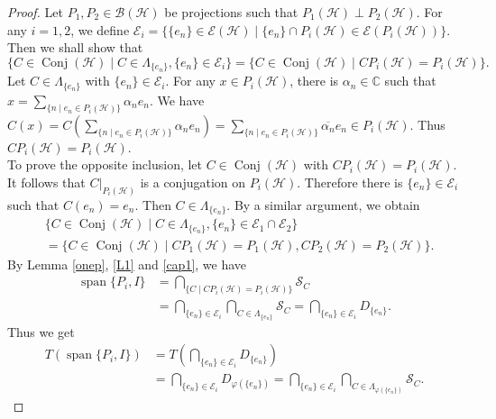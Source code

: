 \documentclass[11pt]{amsart}
\theoremstyle{remark}
\newcommand{\BH}{\mathcal{B(H)}}
\newcommand{\cH}{{\mathcal{H}}}
\newcommand{\SC}{\mathcal{S}_C}
\newcommand{\Conj}{\operatorname{Conj}(\cH)}
\newcommand{\Span}{\operatorname{span}}
\begin{document}
\begin{proof}
Let $P_1, P_2 \in \BH$ be projections such that $P_1(\cH) \perp P_2(\cH)$. 
For any $i=1,2$, we define $\mathcal{E}_i=\{ \{e_n\} \in \mathcal{E}(\cH) \mid \{e_n\} \cap P_i(\cH) \in \mathcal{E}(P_i(\cH))\}$. Then we shall show that 
\begin{equation}\label{cap1}
    \{ C \in \Conj \mid C \in \Lambda_{\{e_n\}}, \{e_n\} \in \mathcal{E}_i\}=\{ C \in \Conj \mid CP_i(\cH)=P_i(\cH)\}.
\end{equation}
Let $C \in \Lambda_{\{e_n\}}$ with $\{e_n\} \in \mathcal{E}_i$. For any $x \in P_i(\cH)$, there is $\alpha_n \in \mathbb{C}$ such that $x=\sum_{\{n \mid e_n \in P_i(\cH)\}} \alpha_ne_n$. We have $C(x)=C(\sum_{\{n \mid e_n \in P_i(\cH)\}} \alpha_ne_n)=\sum_{\{n \mid e_n \in P_i(\cH)\}}\overline{\alpha_n}e_n \in P_i(\cH)$. Thus $CP_i(\cH)=P_i(\cH)$. \\
To prove the opposite inclusion, let $C \in \Conj$ with $CP_i(\cH)=P_i(\cH)$. It follows that $C|_{P_i(\cH)}$ is a conjugation on $P_i(\cH)$. Therefore there is $\{e_n\} \in \mathcal{E}_i$ such that $C(e_n)=e_n$. Then $C \in \Lambda_{\{e_n\}}$. 
By a similar argument, we obtain
\begin{equation}\label{cap12}
    \begin{split}
        &\{ C \in \Conj \mid C \in \Lambda_{\{e_n\}}, \{e_n\} \in \mathcal{E}_1 \cap \mathcal{E}_2\}\\&=\{ C \in \Conj \mid CP_1(\cH)=P_1(\cH), CP_2(\cH)=P_2(\cH)\}.
    \end{split}
\end{equation}
By Lemma \ref{onep}, \ref{L1} and \eqref{cap1}, we have 
\begin{equation*}
    \begin{split}
        \Span\{P_i, I\}&=\bigcap_{\{C \mid CP_i(\cH)=P_i(\cH)\}} \SC\\&
        =\bigcap_{\{e_n\} \in \mathcal{E}_i} \bigcap_{C \in \Lambda_{\{e_n\}}} \SC
        =\bigcap_{\{e_n\} \in \mathcal{E}_i} D_{\{e_n\}}. 
    \end{split}
\end{equation*}
Thus we get
\begin{equation*}
    \begin{split}
        T(\Span\{P_i, I\})
        &=T(\bigcap_{\{e_n\} \in \mathcal{E}_i} D_{\{e_n\}})\\&=\bigcap_{\{e_n\} \in \mathcal{E}_i} D_{\varphi(\{e_n\})}=\bigcap_{\{e_n\} \in \mathcal{E}_i} \bigcap_{C \in \Lambda_{\varphi(\{e_n\})}}\SC. 
    \end{split}

\end{equation*}
\end{proof}
\end{document}

